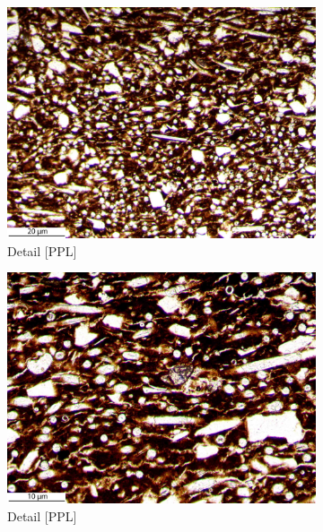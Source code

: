 \documentclass[a4paper]{article}
\begin{document}
\begin{figure}[H]
\begin{subfigure}[t]{.32\textwidth}
		\includegraphics[width=\textwidth]{ThinSections/54-6_10x_PPL.jpg}
		\caption{Detail [PPL]}
	\end{subfigure}\hspace{.5em}\hfill
	\begin{subfigure}[t]{.32\textwidth}
		\includegraphics[width=\textwidth]{ThinSections/54-3_20x_PPL.jpg}
		\caption{Detail [PPL]}
	\end{subfigure}\hspace{.5em}\hfill
	\begin{subfigure}[t]{.32\textwidth}

\end{subfigure}
\end{figure}
\end{document}
